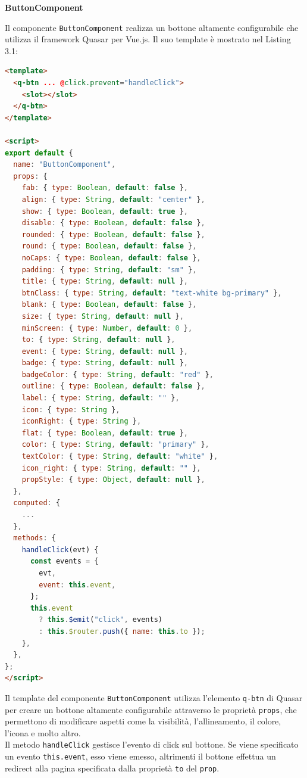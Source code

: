 \documentclass[a4paper, 12pt]{book}
\begin{document}
\textbf{ButtonComponent}

Il componente \texttt{ButtonComponent} realizza un bottone altamente configurabile che utilizza il framework Quasar
per Vue.js. Il suo template è mostrato nel Listing 3.1:\\

\begin{lstlisting}[language=HTML, caption=Template di ButtonComponent]
<template>
  <q-btn ... @click.prevent="handleClick">
    <slot></slot>
  </q-btn>
</template>

<script>
export default {
  name: "ButtonComponent",
  props: {
    fab: { type: Boolean, default: false },
    align: { type: String, default: "center" },
    show: { type: Boolean, default: true },
    disable: { type: Boolean, default: false },
    rounded: { type: Boolean, default: false },
    round: { type: Boolean, default: false },
    noCaps: { type: Boolean, default: false },
    padding: { type: String, default: "sm" },
    title: { type: String, default: null },
    btnClass: { type: String, default: "text-white bg-primary" },
    blank: { type: Boolean, default: false },
    size: { type: String, default: null },
    minScreen: { type: Number, default: 0 },
    to: { type: String, default: null },
    event: { type: String, default: null },
    badge: { type: String, default: null },
    badgeColor: { type: String, default: "red" },
    outline: { type: Boolean, default: false },
    label: { type: String, default: "" },
    icon: { type: String },
    iconRight: { type: String },
    flat: { type: Boolean, default: true },
    color: { type: String, default: "primary" },
    textColor: { type: String, default: "white" },
    icon_right: { type: String, default: "" },
    propStyle: { type: Object, default: null },
  },
  computed: {
    ...
  },
  methods: {
    handleClick(evt) {
      const events = {
        evt,
        event: this.event,
      };
      this.event
        ? this.$emit("click", events)
        : this.$router.push({ name: this.to });
    },
  },
};
</script>
\end{lstlisting}

Il template del componente \texttt{ButtonComponent} utilizza l'elemento \texttt{q-btn} di Quasar per creare un bottone
altamente configurabile attraverso le proprietà \texttt{props}, che permettono di modificare aspetti come
la visibilità, l'allineamento, il colore, l'icona e molto altro.\\

Il metodo \texttt{handleClick} gestisce l'evento di click sul bottone. Se viene specificato un evento \texttt{this.event},
esso viene emesso, altrimenti il bottone effettua un redirect alla pagina specificata dalla proprietà \texttt{to} del
\texttt{prop}.\\
\end{document}
